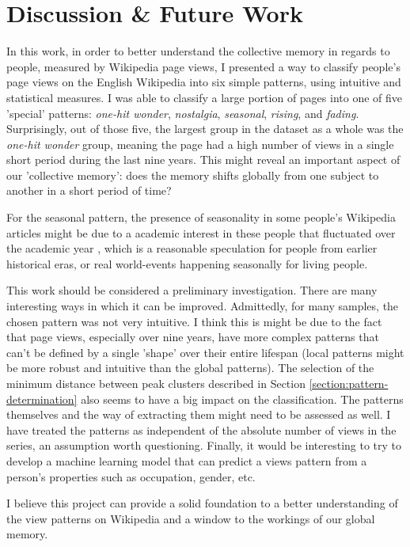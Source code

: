 \documentclass[titlepage]{article}
\newcommand{\ohw}{\textit{one-hit wonder}\xspace}
\newcommand{\nos}{\textit{nostalgia}\xspace}
\newcommand{\sea}{\textit{seasonal}\xspace}
\newcommand{\ris}{\textit{rising}\xspace}
\newcommand{\fad}{\textit{fading}\xspace}
\begin{document}
\section{Discussion \& Future Work \label{section:discussion}}
In this work, in order to better understand the collective memory in regards to people, measured by Wikipedia page views, I presented a way to classify people's page views on the English Wikipedia into six simple patterns, using intuitive and statistical measures. I was able to classify a large portion of pages into one of five 'special' patterns: \ohw, \nos, \sea, \ris, and \fad. Surprisingly, out of those five, the largest group in the dataset as a whole was the \ohw group, meaning the page had a high number of views in a single short period during the last nine years. This might reveal an important aspect of our 'collective memory': does the memory shifts globally from one subject to another in a short period of time?

For the seasonal pattern, the presence of seasonality in some people's Wikipedia articles might be due to a academic interest in these people that fluctuated over the academic year \cite{segevSeekingScienceInformation2012}, which is a reasonable speculation for people from earlier historical eras, or real world-events happening seasonally for living people.

This work should be considered a preliminary investigation. There are many interesting ways in which it can be improved. Admittedly, for many samples, the chosen pattern was not very intuitive. I think this is might be due to the fact that page views, especially over nine years, have more complex patterns that can't be defined by a single 'shape' over their entire lifespan (local patterns might be more robust and intuitive than the global patterns).
The selection of the minimum distance between peak clusters described in Section \ref{section:pattern-determination} also seems to have a big impact on the classification. The patterns themselves and the way of extracting them might need to be assessed as well. I have treated the patterns as independent of the absolute number of views in the series, an assumption worth questioning. Finally, it would be interesting to try to develop a machine learning model that can predict a views pattern from a person's properties such as occupation, gender, etc.

I believe this project can provide a solid foundation to a better understanding of the view patterns on Wikipedia and a window to the workings of our global memory.
\end{document}

